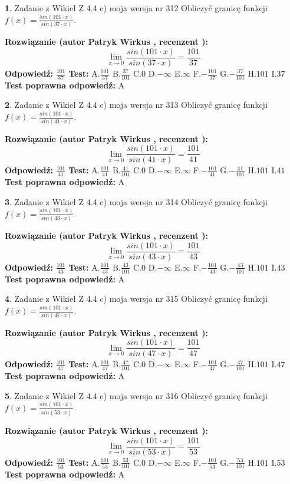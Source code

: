 \documentclass[12pt, a4paper]{article}
\theoremstyle{definition} %
\newtheorem{zad}{}
\newcommand{\zadStart}[1]{\begin{zad}#1\newline}
\newcommand{\zadStop}{\end{zad}}
\newcommand{\rozwStart}[2]{\noindent \textbf{Rozwiązanie (autor #1 , recenzent #2): }\newline}
\newcommand{\rozwStop}{\newline}
\newcommand{\odpStart}{\noindent \textbf{Odpowiedź:}\newline}
\newcommand{\odpStop}{\newline}
\newcommand{\testStart}{\noindent \textbf{Test:}\newline}
\newcommand{\testStop}{\newline}
\newcommand{\kluczStart}{\noindent \textbf{Test poprawna odpowiedź:}\newline}
\newcommand{\kluczStop}{\newline}
\begin{document}
\zadStart{Zadanie z Wikieł Z 4.4 c) moja wersja nr 312}
Obliczyć granicę funkcji $f(x)=\frac{sin(101\cdot x)}{sin(37\cdot x)}$.
\zadStop
\rozwStart{Patryk Wirkus}{}
$$\lim\limits_{x\to 0}\frac{sin(101\cdot x)}{sin(37\cdot x)}=
\frac{101}{37}$$
\rozwStop
\odpStart
$\frac{101}{37}$
\odpStop
\testStart
A.$\frac{101}{37}$
B.$\frac{37}{101}$
C.$0$
D.$-\infty$
E.$\infty$
F.$-\frac{101}{37}$
G.$-\frac{37}{101}$
H.$101$
I.$37$
\testStop
\kluczStart
A
\kluczStop



\zadStart{Zadanie z Wikieł Z 4.4 c) moja wersja nr 313}
Obliczyć granicę funkcji $f(x)=\frac{sin(101\cdot x)}{sin(41\cdot x)}$.
\zadStop
\rozwStart{Patryk Wirkus}{}
$$\lim\limits_{x\to 0}\frac{sin(101\cdot x)}{sin(41\cdot x)}=
\frac{101}{41}$$
\rozwStop
\odpStart
$\frac{101}{41}$
\odpStop
\testStart
A.$\frac{101}{41}$
B.$\frac{41}{101}$
C.$0$
D.$-\infty$
E.$\infty$
F.$-\frac{101}{41}$
G.$-\frac{41}{101}$
H.$101$
I.$41$
\testStop
\kluczStart
A
\kluczStop



\zadStart{Zadanie z Wikieł Z 4.4 c) moja wersja nr 314}
Obliczyć granicę funkcji $f(x)=\frac{sin(101\cdot x)}{sin(43\cdot x)}$.
\zadStop
\rozwStart{Patryk Wirkus}{}
$$\lim\limits_{x\to 0}\frac{sin(101\cdot x)}{sin(43\cdot x)}=
\frac{101}{43}$$
\rozwStop
\odpStart
$\frac{101}{43}$
\odpStop
\testStart
A.$\frac{101}{43}$
B.$\frac{43}{101}$
C.$0$
D.$-\infty$
E.$\infty$
F.$-\frac{101}{43}$
G.$-\frac{43}{101}$
H.$101$
I.$43$
\testStop
\kluczStart
A
\kluczStop



\zadStart{Zadanie z Wikieł Z 4.4 c) moja wersja nr 315}
Obliczyć granicę funkcji $f(x)=\frac{sin(101\cdot x)}{sin(47\cdot x)}$.
\zadStop
\rozwStart{Patryk Wirkus}{}
$$\lim\limits_{x\to 0}\frac{sin(101\cdot x)}{sin(47\cdot x)}=
\frac{101}{47}$$
\rozwStop
\odpStart
$\frac{101}{47}$
\odpStop
\testStart
A.$\frac{101}{47}$
B.$\frac{47}{101}$
C.$0$
D.$-\infty$
E.$\infty$
F.$-\frac{101}{47}$
G.$-\frac{47}{101}$
H.$101$
I.$47$
\testStop
\kluczStart
A
\kluczStop



\zadStart{Zadanie z Wikieł Z 4.4 c) moja wersja nr 316}
Obliczyć granicę funkcji $f(x)=\frac{sin(101\cdot x)}{sin(53\cdot x)}$.
\zadStop
\rozwStart{Patryk Wirkus}{}
$$\lim\limits_{x\to 0}\frac{sin(101\cdot x)}{sin(53\cdot x)}=
\frac{101}{53}$$
\rozwStop
\odpStart
$\frac{101}{53}$
\odpStop
\testStart
A.$\frac{101}{53}$
B.$\frac{53}{101}$
C.$0$
D.$-\infty$
E.$\infty$
F.$-\frac{101}{53}$
G.$-\frac{53}{101}$
H.$101$
I.$53$
\testStop
\kluczStart
A
\kluczStop
\end{document}
